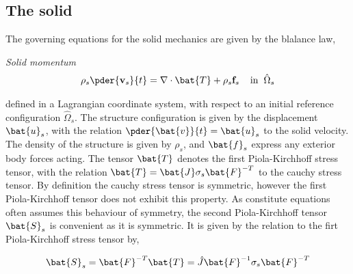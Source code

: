 \subsection{The solid}
The governing equations for the solid mechanics are given by the blalance law,
\begin{equat}
\textit{Solid momentum}
\begin{align}
\rho_s \pder{\mathbf{v}_s}{t} = \nabla \cdot \bat{T} + \rho_s \mathbf{f}_s
\hspace{4mm} \text{in} \hspace{2mm} \hat{\Omega}_s
\end{align}
\end{equat}
defined in a Lagrangian coordinate system, with respect to an initial reference configuration $\hat{\Omega}_s$. The structure configuration is given by the displacement $\bat{u}_s$, with the relation
 $\pder{\bat{v}}{t} = \bat{u}_s$ to the solid velocity. The density of the structure is given by $\rho_s$, and $\bat{f}_s$ express any exterior body forces acting. The tensor $\bat{T}$ denotes the first Piola-Kirchhoff stress tensor, with the relation $\bat{T}  = \bat{J} \sigma_s \bat{F}^{-T}$ to the cauchy stress tensor. By definition the cauchy stress tensor is symmetric, however the first Piola-Kirchhoff tensor does not exhibit this property. As constitute equations often assumes this behaviour of symmetry, the second Piola-Kirchhoff tensor $\bat{S}_s$ is convenient as it is symmetric.  It is given by the relation to the firt Piola-Kirchhoff stress tensor by, 
 
 \begin{align*}
 \bat{S}_s = \bat{F}^{-T} \bat{T} = \hat{J} \bat{F}^{-1} \sigma_s \bat{F}^{-T}
 \end{align*}
 
